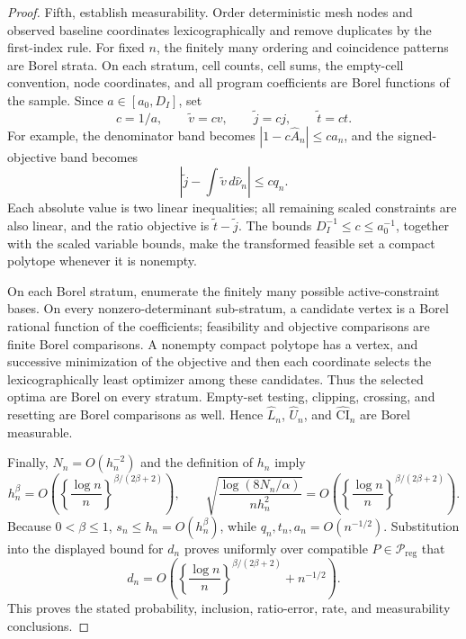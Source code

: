 \documentclass{article}
\begin{document}
\begin{proof}
Fifth, establish measurability.  Order deterministic mesh nodes and observed baseline coordinates lexicographically and remove duplicates by the first-index rule.  For fixed \(n\), the finitely many ordering and coincidence patterns are Borel strata.  On each stratum, cell counts, cell sums, the empty-cell convention, node coordinates, and all program coefficients are Borel functions of the sample.  Since \(a\in[a_0,D_I]\), set
\[
 c=1/a,
 \qquad \widetilde v=cv,
 \qquad \widetilde j=cj,
 \qquad \widetilde t=ct.
\]
For example, the denominator band becomes \(|1-c\widehat A_n|\leq ca_n\), and the signed-objective band becomes
\[
 \left|\widetilde j-\int\widetilde v\,d\widehat\nu_n\right|\leq cq_n.
\]
Each absolute value is two linear inequalities; all remaining scaled constraints are also linear, and the ratio objective is \(\widetilde t-\widetilde j\).  The bounds \(D_I^{-1}\leq c\leq a_0^{-1}\), together with the scaled variable bounds, make the transformed feasible set a compact polytope whenever it is nonempty.

On each Borel stratum, enumerate the finitely many possible active-constraint bases.  On every nonzero-determinant sub-stratum, a candidate vertex is a Borel rational function of the coefficients; feasibility and objective comparisons are finite Borel comparisons.  A nonempty compact polytope has a vertex, and successive minimization of the objective and then each coordinate selects the lexicographically least optimizer among these candidates.  Thus the selected optima are Borel on every stratum.  Empty-set testing, clipping, crossing, and resetting are Borel comparisons as well.  Hence \(\widehat L_n\), \(\widehat U_n\), and \(\widehat{\mathrm{CI}}_n\) are Borel measurable.

Finally, \(N_n=O(h_n^{-2})\) and the definition of \(h_n\) imply
\[
 h_n^\beta
 =O\!\left(\left\{\frac{\log n}{n}\right\}^{\beta/(2\beta+2)}\right),
 \qquad
 \sqrt{\frac{\log(8N_n/\alpha)}{nh_n^2}}
 =O\!\left(\left\{\frac{\log n}{n}\right\}^{\beta/(2\beta+2)}\right).
\]
Because \(0<\beta\leq1\), \(s_n\leq h_n=O(h_n^\beta)\), while \(q_n,t_n,a_n=O(n^{-1/2})\).  Substitution into the displayed bound for \(d_n\) proves uniformly over compatible \(P\in\mathcal P_{\mathrm{reg}}\) that
\[
 d_n=O\!\left(\left\{\frac{\log n}{n}\right\}^{\beta/(2\beta+2)}+n^{-1/2}\right).
\]
This proves the stated probability, inclusion, ratio-error, rate, and measurability conclusions.
\end{proof}
\end{document}
